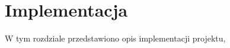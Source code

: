 \chapter{Implementacja}
	
	W tym rozdziale przedstawiono opis implementacji projektu,  



	
	
	
	
	
	
	
	
	
	